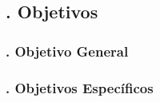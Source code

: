 \subsection{. Objetivos}\label{sec:objetivos}

\subsubsection{. Objetivo General}\label{sec:objetivo_general}



\subsubsection{. Objetivos Específicos}\label{sec:objetivos_especificos}


